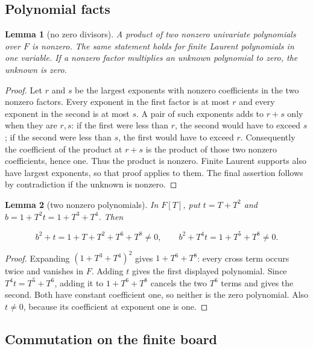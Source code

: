 \documentclass{article}
\newtheorem{lemma}{Lemma}
\begin{document}
\subsection{Polynomial facts}\label{polynomial-facts}

\begin{lemma}[no zero divisors]\label{lem:domain}
A product of two nonzero univariate polynomials over
\(F\) is nonzero. The same statement holds for finite Laurent
polynomials in one variable. If a nonzero factor multiplies an unknown
polynomial to zero, the unknown is zero.
\end{lemma}

\begin{proof}
Let \(r\) and \(s\) be the largest exponents with
nonzero coefficients in the two nonzero factors. Every exponent in the
first factor is at most \(r\) and every exponent in the second is at
most \(s\). A pair of such exponents adds to \(r+s\) only when they are
\(r,s\): if the first were less than \(r\), the second would have to
exceed \(s\); if the second were less than \(s\), the first would have
to exceed \(r\). Consequently the coefficient of the product at \(r+s\)
is the product of those two nonzero coefficients, hence one. Thus the
product is nonzero. Finite Laurent supports also have largest exponents,
so that proof applies to them. The final assertion follows by
contradiction if the unknown is nonzero.
\end{proof}

\begin{lemma}[two nonzero polynomials]\label{lem:nonzero}
In \(F[T]\), put \(t=T+T^2\) and
\(b=1+T^2t=1+T^3+T^4\). Then

\begin{equation}
 b^2+t=1+T+T^2+T^6+T^8\ne0,
 \qquad b^2+T^4t=1+T^5+T^8\ne0.
\end{equation}
\end{lemma}

\begin{proof}
Expanding \((1+T^3+T^4)^2\) gives \(1+T^6+T^8\): every
cross term occurs twice and vanishes in \(F\). Adding \(t\) gives the
first displayed polynomial. Since \(T^4t=T^5+T^6\), adding it to
\(1+T^6+T^8\) cancels the two \(T^6\) terms and gives the second. Both
have constant coefficient one, so neither is the zero polynomial. Also
\(t\ne 0\), because its coefficient at exponent one is one.
\end{proof}

\subsection{Commutation on the finite
board}\label{commutation-on-the-finite-board}
\end{document}
